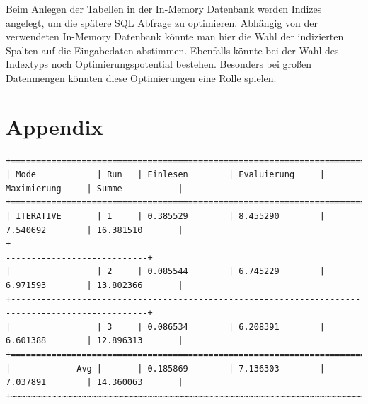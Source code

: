 \documentclass[draft,final]{vutinfth} %
\begin{document}
Beim Anlegen der Tabellen in der In-Memory Datenbank werden Indizes angelegt, um die spätere SQL Abfrage zu optimieren. Abhängig von der verwendeten In-Memory Datenbank könnte man hier die Wahl der indizierten Spalten auf die Eingabedaten abstimmen. Ebenfalls könnte bei der Wahl des Indextyps noch Optimierungspotential bestehen. Besonders bei gro\ss en Datenmengen könnten diese Optimierungen eine Rolle spielen.


\chapter*{Appendix} \label{apendix}

\begin{lstlisting}[float,basicstyle=\tiny,caption={Benchmark ITERATIVE, Datei: lubm-ex-20-15.sparql.xml},label={lst:bi15raw}]
+=================================================================================================+
| Mode            | Run   | Einlesen        | Evaluierung     | Maximierung     | Summe           | 
+=================================================================================================+
| ITERATIVE       | 1     | 0.385529        | 8.455290        | 7.540692        | 16.381510       | 
+-------------------------------------------------------------------------------------------------+
|                 | 2     | 0.085544        | 6.745229        | 6.971593        | 13.802366       | 
+-------------------------------------------------------------------------------------------------+
|                 | 3     | 0.086534        | 6.208391        | 6.601388        | 12.896313       | 
+=================================================================================================+
|             Avg |       | 0.185869        | 7.136303        | 7.037891        | 14.360063       |
+~~~~~~~~~~~~~~~~~~~~~~~~~~~~~~~~~~~~~~~~~~~~~~~~~~~~~~~~~~~~~~~~~~~~~~~~~~~~~~~~~~~~~~~~~~~~~~~~~+
\end{lstlisting}
\end{document}
